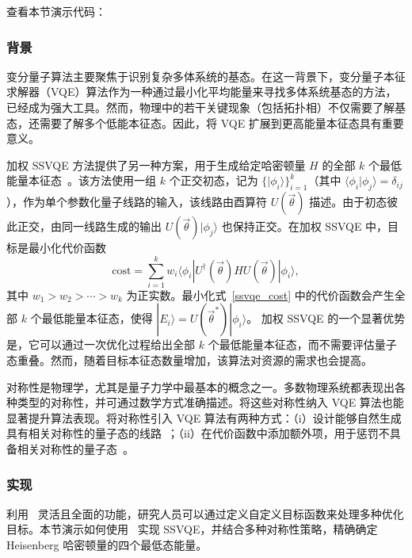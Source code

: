 查看本节演示代码： \ 

\subsubsection{背景}
变分量子算法主要聚焦于识别复杂多体系统的基态。在这一背景下，变分量子本征求解器（VQE）算法作为一种通过最小化平均能量来寻找多体系统基态的方法，已经成为强大工具。然而，物理中的若干关键现象（包括拓扑相）不仅需要了解基态，还需要了解多个低能本征态。因此，将 VQE 扩展到更高能量本征态具有重要意义。

加权 SSVQE 方法提供了另一种方案，用于生成给定哈密顿量 $H$ 的全部 $k$ 个最低能量本征态~\cite{nakanishi2019subspace}。该方法使用一组 $k$ 个正交初态，记为 $\{|\phi_{i}\rangle\}_{i=1}^{k}$（其中 $\langle \phi_{i} | \phi_{j} \rangle = \delta_{ij}$），作为单个参数化量子线路的输入，该线路由酉算符 $U(\vec{\theta})$ 描述。由于初态彼此正交，由同一线路生成的输出 $U(\vec{\theta})| \phi_{j} \rangle$ 也保持正交。在加权 SSVQE 中，目标是最小化代价函数
\begin{equation}
    \mathrm{cost} = \sum_{i=1}^{k} w_{i} \langle \phi_{i}| U^{\dagger}(\vec{\theta}) H U(\vec{\theta}) | \phi_{i} \rangle,
    \label{ssvqe_cost}
\end{equation}
其中 $w_1 > w_2 > \cdots > w_k$ 为正实数。最小化式~\eqref{ssvqe_cost} 中的代价函数会产生全部 $k$ 个最低能量本征态，使得 $|E_{i}\rangle = U(\vec{\theta}^{*})|\phi_{i}\rangle$。
加权 SSVQE 的一个显著优势是，它可以通过一次优化过程给出全部 $k$ 个最低能量本征态，而不需要评估量子态重叠。然而，随着目标本征态数量增加，该算法对资源的需求也会提高。

对称性是物理学，尤其是量子力学中最基本的概念之一。多数物理系统都表现出各种类型的对称性，并可通过数学方式准确描述。将这些对称性纳入 VQE 算法也能显著提升算法表现。将对称性引入 VQE 算法有两种方式：（i）设计能够自然生成具有相关对称性的量子态的线路~\cite{Lyu2020accelerated,Gard2020,barron2021preserving}；（ii）在代价函数中添加额外项，用于惩罚不具备相关对称性的量子态~\cite{mcclean2016theory,ryabinkin2018constrained}。

\subsubsection{实现}
利用 \MindQuantum\ 灵活且全面的功能，研究人员可以通过定义自定义目标函数来处理多种优化目标。本节演示如何使用 \MindQuantum\ 实现 SSVQE，并结合多种对称性策略，精确确定 Heisenberg 哈密顿量的四个最低态能量。

